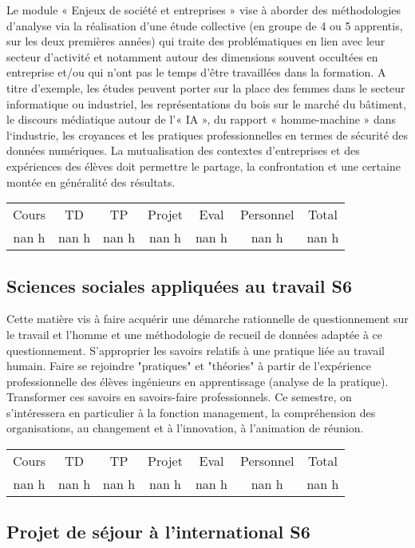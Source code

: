 %
Le module « Enjeux de société et entreprises » vise à aborder des méthodologies d’analyse via la réalisation d’une étude collective (en groupe de 4 ou 5 apprentis, sur les deux premières années) qui traite des problématiques en lien avec leur secteur d’activité et notamment autour des dimensions souvent occultées en entreprise et/ou qui n’ont pas le temps d’être travaillées dans la formation. A titre d’exemple, les études peuvent porter sur la place des femmes dans le secteur informatique ou industriel, les représentations du bois sur le marché du bâtiment, le discours médiatique autour de l’« IA », du rapport « homme{-}machine » dans l‘industrie, les croyances et les pratiques professionnelles en termes de sécurité des données numériques. La mutualisation des contextes d’entreprises et des expériences des élèves doit permettre le partage, la confrontation et une certaine montée en généralité des résultats.%
\begin{longtable}{c c c c c c c}%
\hline%
Cours&TD&TP&Projet&Eval&Personnel&Total\\%
nan h&nan h&nan h&nan h&nan h&nan h&nan h\\%
\hline%
\end{longtable}%
\subsection{Sciences sociales appliquées au travail S6}%
\label{subsec:SciencessocialesappliquesautravailS6}%

%
Cette matière vis à faire acquérir une démarche rationnelle de questionnement sur le travail et l'homme et une méthodologie de recueil de données adaptée à ce questionnement. S'approprier les savoirs relatifs à une pratique liée au travail humain. Faire se rejoindre "pratiques" et "théories" à partir de l'expérience professionnelle des élèves ingénieurs en apprentissage (analyse de la pratique). Transformer ces savoirs en savoirs{-}faire professionnels. Ce semestre, on s'intéressera en particulier à la fonction management, la compréhension des organisations, au changement et à l'innovation, à l'animation de réunion.%
\begin{longtable}{c c c c c c c}%
\hline%
Cours&TD&TP&Projet&Eval&Personnel&Total\\%
nan h&nan h&nan h&nan h&nan h&nan h&nan h\\%
\hline%
\end{longtable}%
\subsection{Projet de séjour à l'international S6}%
\label{subsec:ProjetdesjourlinternationalS6}%

